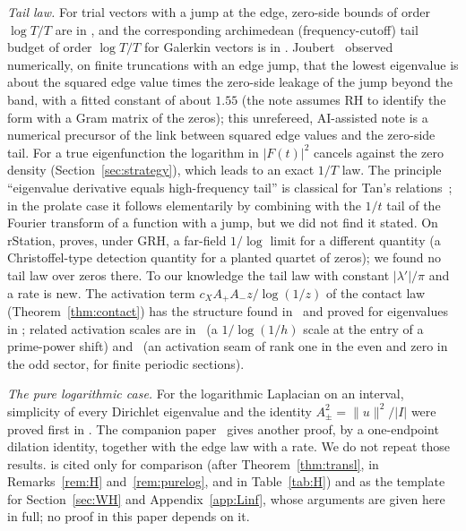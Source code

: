 \documentclass[11pt]{amsart}
\theoremstyle{definition}
\theoremstyle{remark}
\numberwithin{equation}{section}
\begin{document}
\emph{Tail law.} For trial vectors with a jump at the edge, zero-side bounds of order $\log T/T$ are in \cite[\S``The zero sum'']{MoriIII}, and the corresponding archimedean (frequency-cutoff) tail budget of order $\log T/T$ for Galerkin vectors is in \cite[Thm.~3.2, Cor.~3.3]{Gro26}. Joubert~\cite{Jou} observed numerically, on finite truncations with an edge jump, that the lowest eigenvalue is about the squared edge value times the zero-side leakage of the jump beyond the band, with a fitted constant of about $1.55$ (the note assumes RH to identify the form with a Gram matrix of the zeros); this unrefereed, AI-assisted note is a numerical precursor of the link between squared edge values and the zero-side tail. For a true eigenfunction the logarithm in $|F(t)|^2$ cancels against the zero density (Section~\ref{sec:strategy}), which leads to an exact $1/T$ law. The principle ``eigenvalue derivative equals high-frequency tail'' is classical for Tan's relations~\cite{Tan08a,Tan08b,BP08}; in the prolate case it follows elementarily by combining \cite[eq.~(43)]{BK17} with the $1/t$ tail of the Fourier transform of a function with a jump, but we did not find it stated. On rStation, \cite[Prop.~6.1]{SoD66} proves, under GRH, a far-field $1/\log$ limit for a different quantity (a Christoffel-type detection quantity for a planted quartet of zeros); we found no tail law over zeros there. To our knowledge the tail law with constant $|\lambda'|/\pi$ and a rate is new. The activation term $c_XA_+A_-z/\log(1/z)$ of the contact law (Theorem~\ref{thm:contact}) has the structure found in~\cite{PL338} and proved for eigenvalues in \cite[Thm.~2.4]{BT26}; related activation scales are in~\cite{Tuma} (a $1/\log(1/h)$ scale at the entry of a prime-power shift) and~\cite{Lee} (an activation seam of rank one in the even and zero in the odd sector, for finite periodic sections).

\emph{The pure logarithmic case.} For the logarithmic Laplacian on an interval, simplicity of every Dirichlet eigenvalue and the identity $A_\pm^2=\|u\|^2/|I|$ were proved first in \cite[Cor.~2.3]{BT26}. The companion paper~\cite{BPL} gives another proof, by a one-endpoint dilation identity, together with the edge law with a rate. We do not repeat those results. \cite{BPL} is cited only for comparison (after Theorem~\ref{thm:transl}, in Remarks~\ref{rem:H} and~\ref{rem:purelog}, and in Table~\ref{tab:H}) and as the template for Section~\ref{sec:WH} and Appendix~\ref{app:Linf}, whose arguments are given here in full; no proof in this paper depends on it.
\end{document}
